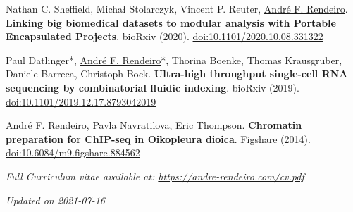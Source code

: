 \documentclass[11pt,a4paper,roman]{moderncv} %
\begin{document}
        \begin{etaremune}[leftmargin=1.0cm, itemindent=0pt, topsep=10pt, itemsep=2pt, partopsep=0pt, parsep=0pt]

        \item Nathan C. Sheffield, Michał Stolarczyk, Vincent P. Reuter, \underline{André F. Rendeiro}. \textbf{Linking big biomedical datasets to modular analysis with Portable Encapsulated Projects}. bioRxiv (2020).
        \href{https://dx.doi.org/10.1101/2020.10.08.331322}{doi:10.1101/2020.10.08.331322}

        \item Paul Datlinger*, \underline{André F. Rendeiro}*, Thorina Boenke, Thomas Krausgruber, Daniele Barreca, Christoph Bock. \textbf{Ultra-high throughput single-cell RNA sequencing by combinatorial fluidic indexing}. bioRxiv (2019).
        \href{https://dx.doi.org/10.1101/2019.12.17.8793042019}{doi:10.1101/2019.12.17.8793042019}

        \item \underline{André F. Rendeiro}, Pavla  Navratilova, Eric Thompson. \textbf{Chromatin preparation for ChIP-seq in Oikopleura dioica}. Figshare (2014).
        \href{https://dx.doi.org/10.6084/m9.figshare.884562}{doi:10.6084/m9.figshare.884562}

        \end{etaremune}


\bigskip
\textit{Full Curriculum vitae available at: \href{https://andre-rendeiro.com/cv.pdf}{https://andre-rendeiro.com/cv.pdf}}

\bigskip
\textit{Updated on 2021-07-16}
\end{document}

